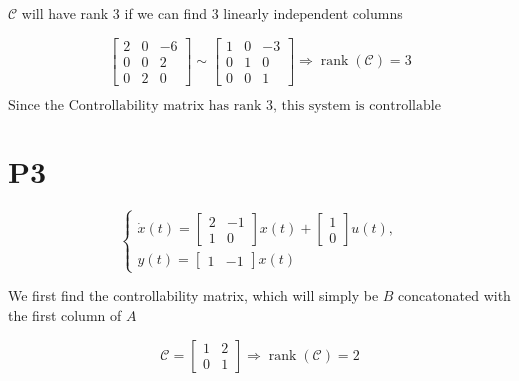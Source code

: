 \documentclass{article}
\begin{document}
\begin{enumerate}[label=\alph*)]
\begin{enumerate}[label=\roman*)]
        $\mathcal{C}$ will have rank 3 if we can find 3 linearly independent columns

        \[
        \begin{bmatrix}
            2 & 0 & -6 \\
            0 & 0 & 2 \\
            0 & 2 & 0
        \end{bmatrix}
        \sim
        \begin{bmatrix}
            1 & 0 & -3 \\
            0 & 1 & 0 \\
            0 & 0 & 1
        \end{bmatrix}
        \Rightarrow \operatorname{rank}(\mathcal{C}) = 3
        \]

    $\boxed{\text{Since the Controllability matrix has rank 3, this system is controllable}}$


    \end{enumerate}

\end{enumerate}

\section*{P3}

\[
\left\{
    \begin{array}{l}
        \dot x(t) = 
        \begin{bmatrix}
            2 & -1 \\
            1 & 0 
        \end{bmatrix}
        x(t) + 
        \begin{bmatrix}
            1 \\
            0
        \end{bmatrix}
        u(t), \\
        y(t) = 
        \begin{bmatrix}
            1 & -1
        \end{bmatrix}
        x(t)
    \end{array}
\right.
\]

We first find the controllability matrix, which will simply be $B$ concatonated with the first column of $A$

\[
    \mathcal{C} =
    \begin{bmatrix}
        1 & 2 \\
        0 & 1
    \end{bmatrix}
    \Rightarrow \operatorname{rank}(\mathcal{C}) = 2
\]
\end{document}
